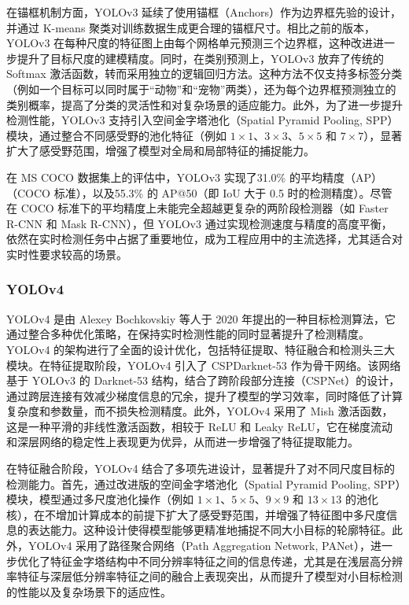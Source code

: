 \documentclass[11pt,twocolumn]{ctexart}
\begin{document}
在锚框机制方面，YOLOv3 延续了使用锚框（Anchors）作为边界框先验的设计，并通过 K-means 聚类对训练数据生成更合理的锚框尺寸。相比之前的版本，YOLOv3 在每种尺度的特征图上由每个网格单元预测三个边界框，这种改进进一步提升了目标尺度的建模精度。同时，在类别预测上，YOLOv3 放弃了传统的 Softmax 激活函数，转而采用独立的逻辑回归方法。这种方法不仅支持多标签分类（例如一个目标可以同时属于“动物”和“宠物”两类），还为每个边界框预测独立的类别概率，提高了分类的灵活性和对复杂场景的适应能力。此外，为了进一步提升检测性能，YOLOv3 支持引入空间金字塔池化（Spatial Pyramid Pooling, SPP）模块，通过整合不同感受野的池化特征（例如 $1\times1$、$3\times3$、$5\times5$ 和 $7\times7$），显著扩大了感受野范围，增强了模型对全局和局部特征的捕捉能力。

在 MS COCO 数据集上的评估中，YOLOv3 实现了31.0\% 的平均精度（AP）（COCO 标准），以及55.3\% 的 AP@50（即 IoU 大于 0.5 时的检测精度）。尽管在 COCO 标准下的平均精度上未能完全超越更复杂的两阶段检测器（如 Faster R-CNN 和 Mask R-CNN），但 YOLOv3 通过实现检测速度与精度的高度平衡，依然在实时检测任务中占据了重要地位，成为工程应用中的主流选择，尤其适合对实时性要求较高的场景。
\subsubsection{YOLOv4}
YOLOv4 是由 Alexey Bochkovskiy 等人于 2020 年提出的一种目标检测算法，它通过整合多种优化策略，在保持实时检测性能的同时显著提升了检测精度。YOLOv4 的架构进行了全面的设计优化，包括特征提取、特征融合和检测头三大模块。在特征提取阶段，YOLOv4 引入了 CSPDarknet-53 作为骨干网络。该网络基于 YOLOv3 的 Darknet-53 结构，结合了跨阶段部分连接（CSPNet）的设计，通过跨层连接有效减少梯度信息的冗余，提升了模型的学习效率，同时降低了计算复杂度和参数量，而不损失检测精度。此外，YOLOv4 采用了 Mish 激活函数，这是一种平滑的非线性激活函数，相较于 ReLU 和 Leaky ReLU，它在梯度流动和深层网络的稳定性上表现更为优异，从而进一步增强了特征提取能力。

在特征融合阶段，YOLOv4 结合了多项先进设计，显著提升了对不同尺度目标的检测能力。首先，通过改进版的空间金字塔池化（Spatial Pyramid Pooling, SPP）模块，模型通过多尺度池化操作（例如 $1\times1$、$5\times5$、$9\times9$ 和 $13\times13$ 的池化核），在不增加计算成本的前提下扩大了感受野范围，并增强了特征图中多尺度信息的表达能力。这种设计使得模型能够更精准地捕捉不同大小目标的轮廓特征。此外，YOLOv4 采用了路径聚合网络（Path Aggregation Network, PANet），进一步优化了特征金字塔结构中不同分辨率特征之间的信息传递，尤其是在浅层高分辨率特征与深层低分辨率特征之间的融合上表现突出，从而提升了模型对小目标检测的性能以及复杂场景下的适应性。
\end{document}
